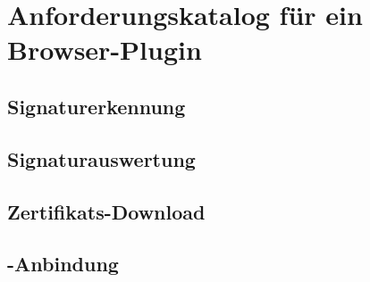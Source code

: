 
\chapter{Anforderungskatalog für ein Browser-Plugin}
\label{chap:Anforderungskatalog}

\section{Signaturerkennung}
\label{sec:Anforderungskatalog:Signaturerkennung}


\section{Signaturauswertung}
\label{sec:Anforderungskatalog:Signaturauswertung}

\section{Zertifikats-Download}
\label{sec:Anforderungskatalog:Zertifikats-Download}

\section{\protect{}-Anbindung}
\label{sec:Anforderungskatalog:GnuPG-Anbindung}
